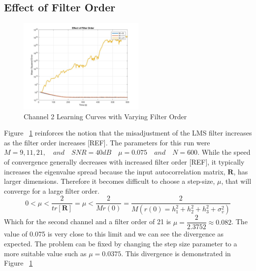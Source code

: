 \documentclass[journal]{IEEEtran}
\begin{document}
\subsection{Effect of Filter Order}
\begin{figure}[H]
  \centering
  \captionsetup{justification=centering,font = small}
  \includegraphics[width=0.55\textwidth, right] {Plots/Project1_Part3.jpg}
  \caption{Channel 2 Learning Curves with Varying Filter Order}
    \label{fig:filterorder1}
\end{figure}
Figure ~\ref{fig:filterorder1} reinforces the notion that the misadjustment
of the LMS filter increases as the filter order increases [REF]. The parameters for this run were $M = 9, 11, 21, \quad and \quad SNR = 40dB
\quad \mu = 0.075 \quad and \quad N = 600$. While the speed of convergence
generally decreases with increased filter order [REF], it typically increases the eigenvalue spread
because the input autocorrelation matrix, $\boldsymbol{R}$, has larger dimensions. Therefore it becomes difficult to
choose a step-size, $\mu$, that will converge for a large filter order.
$$0 < \mu < \dfrac{2}{tr[\boldsymbol{R}]} = \mu < \dfrac{2}{Mr(0)}  = \dfrac{2}{M(r(0) = h_1^2 + h_2^2 + h_3^2 + \sigma^2_v)} $$
Which for the second channel and a filter order of 21 is
$\mu = \dfrac{2}{2.3752} \approx 0.082$. The value of 0.075 is very close to this limit and we can see the divergence as expected.
The problem can be fixed by changing the
step size parameter to a more suitable value such as $ \mu = 0.0375$.
This divergence is demonstrated in Figure ~\ref{fig:filterorder1}
\end{document}

